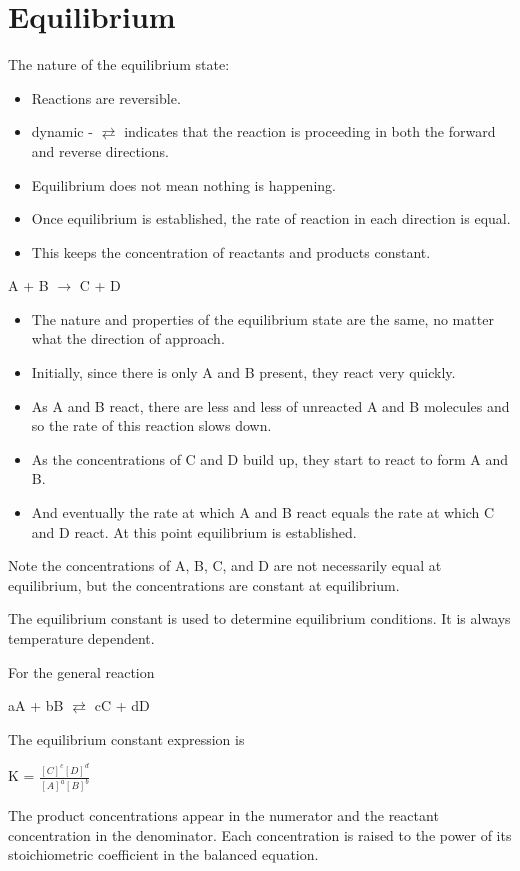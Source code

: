 \documentclass[../hchem.tex]{subfiles}
\begin{document}
\chapter{Equilibrium}
The nature of the equilibrium state:
\begin{itemize}
    \item Reactions are reversible.
    \item dynamic - $\rightleftarrows$ indicates that the reaction is proceeding in both the forward and reverse directions.
    \item Equilibrium does not mean nothing is happening.
    \item Once equilibrium is established, the rate of reaction in each direction is equal.
    \item This keeps the concentration of reactants and products constant.
\end{itemize}

\begin{center}
    A + B $\rightarrow$ C + D 
\end{center}
\begin{itemize}
    \item The nature and properties of the equilibrium state are the same, no matter what the direction of approach.
    \item Initially, since there is only A and B present, they react very quickly.
    \item As A and B react, there are less and less of unreacted A and B molecules and so the rate of this reaction slows down.
    \item As the concentrations of C and D build up, they start to react to form A and B.
    \item And eventually the rate at which A and B react equals the rate at which C and D react. At this point equilibrium is established.
\end{itemize}
Note the concentrations of A, B, C, and D are not necessarily equal at equilibrium, but the concentrations are constant at equilibrium.

The equilibrium constant is used to determine equilibrium conditions. It is always temperature dependent.

For the general reaction 
\begin{center}
    aA + bB $\rightleftarrows$ cC + dD 
\end{center}
The equilibrium constant expression is 
\begin{center}
    K = $\frac{[C]^c[D]^d}{[A]^a[B]^b}$
\end{center}
The product concentrations appear in the numerator and the reactant concentration in the denominator.
Each concentration is raised to the power of its stoichiometric coefficient in the balanced equation.
\end{document}
